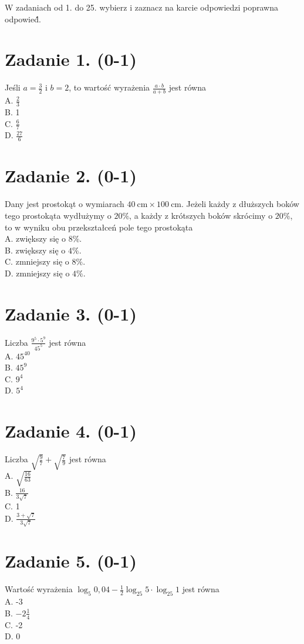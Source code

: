 \documentclass[10pt]{article}
\begin{document}
W zadaniach od 1. do 25. wybierz i zaznacz na karcie odpowiedzi poprawna odpowied́́.

\section*{Zadanie 1. (0-1)}
Jeśli \(a=\frac{3}{2}\) i \(b=2\), to wartość wyrażenia \(\frac{a \cdot b}{a+b}\) jest równa\\
A. \(\frac{2}{3}\)\\
B. 1\\
C. \(\frac{6}{7}\)\\
D. \(\frac{27}{6}\)

\section*{Zadanie 2. (0-1)}
Dany jest prostokąt o wymiarach \(40 \mathrm{~cm} \times 100 \mathrm{~cm}\). Jeżeli każdy z dłuższych boków tego prostokąta wydłużymy o \(20 \%\), a każdy z krótszych boków skrócimy o \(20 \%\), to w wyniku obu przekształceń pole tego prostokąta\\
A. zwiększy się o \(8 \%\).\\
B. zwiększy się o \(4 \%\).\\
C. zmniejszy się o \(8 \%\).\\
D. zmniejszy się o \(4 \%\).

\section*{Zadanie 3. (0-1)}
Liczba \(\frac{9^{5} \cdot 5^{9}}{45^{5}}\) jest równa\\
A. \(45^{40}\)\\
B. \(45^{9}\)\\
C. \(9^{4}\)\\
D. \(5^{4}\)

\section*{Zadanie 4. (0-1)}
Liczba \(\sqrt{\frac{9}{7}}+\sqrt{\frac{7}{9}}\) jest równa\\
A. \(\sqrt{\frac{16}{63}}\)\\
B. \(\frac{16}{3 \sqrt{7}}\)\\
C. 1\\
D. \(\frac{3+\sqrt{7}}{3 \sqrt{7}}\)

\section*{Zadanie 5. (0-1)}
Wartość wyrażenia \(\log _{5} 0,04-\frac{1}{2} \log _{25} 5 \cdot \log _{25} 1\) jest równa\\
A. -3\\
B. \(-2 \frac{1}{4}\)\\
C. -2\\
D. 0
\end{document}
